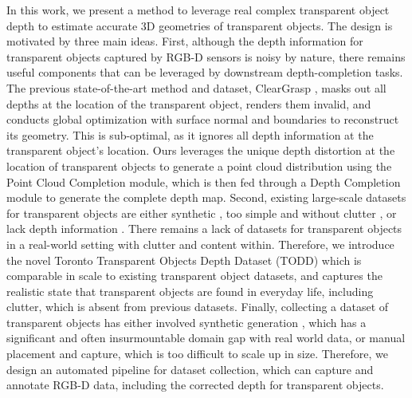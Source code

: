 \documentclass{article}
\newcommand{\dataName}{TODD}
\begin{document}
In this work, we present a method to leverage real complex transparent object depth to estimate accurate 3D geometries of transparent objects. The design is motivated by three main ideas.
First, although the depth information for transparent objects captured by RGB-D sensors is noisy by nature, there remains useful components that can be leveraged by downstream depth-completion tasks. The previous state-of-the-art method and dataset, ClearGrasp \citep{ClearGrasp}, masks out all depths at the location of the transparent object, renders them invalid, and conducts global optimization with surface normal and boundaries to reconstruct its geometry. This is sub-optimal, as it ignores all depth information at the transparent object's location. Ours leverages the unique depth distortion at the location of transparent objects to generate a point cloud distribution using the Point Cloud Completion module, which is then fed through a Depth Completion module to generate the complete depth map. 
Second, existing large-scale datasets for transparent objects are either synthetic \citep{ClearGrasp}, too simple and without clutter \citep{Keypose}, or lack depth information \citep{TransLab}. There remains a lack of datasets for transparent objects in a real-world setting with clutter and content within. Therefore, we introduce the novel Toronto Transparent Objects Depth Dataset (\dataName) which is comparable in scale to existing transparent object datasets, and captures the realistic state that transparent objects are found in everyday life, including clutter, which is absent from previous datasets. 
Finally, collecting a dataset of transparent objects has either involved synthetic generation \citep{ClearGrasp}, which has a significant and often insurmountable domain gap with real world data, or manual placement and capture, which is too difficult to scale up in size. Therefore, we design an automated pipeline for dataset collection, which can capture and annotate RGB-D data, including the corrected depth for transparent objects.
    
\end{document}
